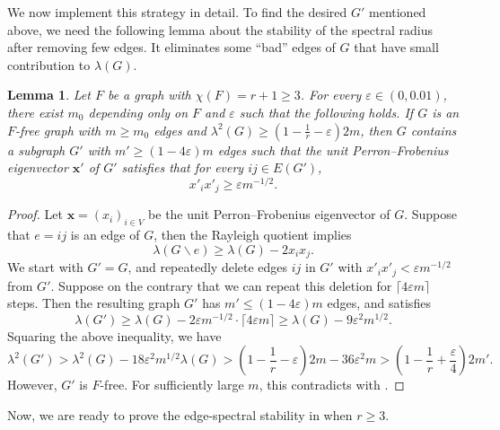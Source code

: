 \documentclass[11pt,a4paper]{article}
\newtheorem{lemma}[theorem]{Lemma}
\theoremstyle{definition}
\theoremstyle{remark}
\newcommand{\ceil}[1]{\lceil #1\rceil}
\newcommand{\eps}{\varepsilon}
\begin{document}
We now implement this strategy in detail. To find the desired $G'$ mentioned above, we need the following lemma about the stability of the spectral radius after removing few edges. It eliminates some ``bad'' edges of $G$ that have small contribution to $\lambda(G)$. 


\begin{lemma}
\label{lem:removing-bad-edges}
Let $F$ be a graph with $\chi (F)=r+1\ge 3$. For every $\varepsilon \in (0, 0.01)$, there exist $m_0$ depending only on $F$ and $\varepsilon$ such that the following holds. If $G$ is an $F$-free graph with $m\ge m_0$ edges and $\lambda^2 (G)\ge (1- \frac{1}{r} - \varepsilon) 2m$, then $G$ contains a subgraph $G'$ with  $m'\ge (1 - 4\eps) m$ edges such that the unit Perron--Frobenius eigenvector $\bm{x}'$ of $G'$ satisfies that for every  $ij \in E(G')$, 
$$x'_i x'_j \geq \varepsilon m^{-1/2}.$$
\end{lemma}
\begin{proof}
    Let $\bm{x}=(x_i)_{i\in V}$ be the unit Perron--Frobenius eigenvector of $G$. 
    Suppose that $e = ij$ is an edge of $G$, then the Rayleigh quotient implies 
    $$\lambda(G \backslash e) \geq \lambda(G) - 2x_i x_j.$$ 
    We start with $G' = G$, and repeatedly delete edges $ij$ in $G'$ with $x'_i x'_j < \varepsilon m^{-1/2}$ from $G'$. Suppose on the contrary that we can repeat this deletion for $\ceil{4\varepsilon m}$ steps. Then the resulting graph $G'$ has $m' \leq (1 - 4\varepsilon)m$ edges, and satisfies
    $$\lambda(G') \geq \lambda(G) - 2\varepsilon m^{-1/2} \cdot \ceil{4\varepsilon m} \geq \lambda(G) - 9\varepsilon^2 m^{1/2}.$$
    Squaring the above inequality, we have 
    $$\lambda^2(G') > \lambda^2(G) - 18\varepsilon^2 m^{1/2} \lambda(G) > 
    \left(1- \frac{1}{r} - \varepsilon \right) 2m - 36 \varepsilon^2 m > 
    \left(1- \frac{1}{r} + \frac{\varepsilon}{4} \right) 2m'.$$
    However, $G'$ is $F$-free. For sufficiently large $m$, this contradicts with .
\end{proof} 

Now, we are ready to prove the edge-spectral stability in   when $r\ge 3$. 
\end{document}
